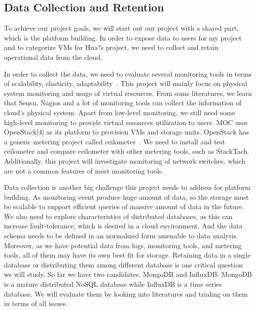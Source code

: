 \subsection{Data Collection and Retention}

To achieve our project goals, we will start out our project with a shared part, which is the platform building. In order to expose data to users for my project and to categorize VMs for Hua?s project, we need to collect and retain operational data from the cloud. 

  In order to collect the data, we need to evaluate several monitoring tools in terms of scalability, elasticity, adaptability~\cite{Aceto2013}. This project will mainly focus on physical system monitoring and usage of virtual resources. From some literatures, we learn that Sensu, Nagios and a lot of monitoring tools can collect the information of cloud's physical system. Apart from low-level monitoring, we still need some high-level monitoring to provide virtual resources utilization to users. MOC uses OpenStack[4] as its platform to provision VMs and storage units. OpenStack has a generic metering project called ceilometer~\cite{ceilometer}. We need to install and test ceilometer and compare ceilometer with other metering tools, such as StackTach. Additionally, this project will investigate monitoring of network switches, which are not a common features of most monitoring tools. 
  
  Data collection is another big challenge this project needs to address for platform building. As monitoring event produce huge amount of data, so the storage must be scalable to support efficient queries of massive amount of data in the future. We also need to explore characteristics of distributed databases, as this can increase fault-tolerance, which is desired in a cloud environment. And the data schema needs to be defined in an normalized form amenable to data analysis. Moreover, as we have potential data from logs, monitoring tools, and metering tools, all of them may have its own best fit for storage. Retaining data in a single database or distributing them among different database is one critical question we will study. So far we have two candidates, MongoDB and InfluxDB. MongoDB is a mature distributed NoSQL database while InfluxDB is a time series database. We will evaluate them by looking into literatures and trialing on them in terms of all issues.